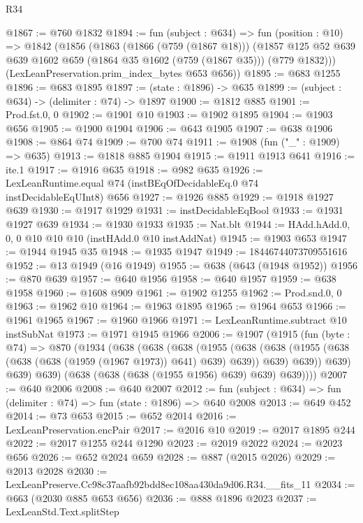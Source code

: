 \begin{lexlean}{R34}
\begin{coremodule}
@1867 := @760 @1832
@1894 := fun (subject : @634) =>
  fun (position : @10) =>
  @1842
    (@1856
      (@1863
        (@1866 (@759 (@1867 @18)))
        (@1857 @125 @52 @639 @639 @1602 @659 (@1864 @35 @1602 (@759 (@1867 @35))) (@779 @1832)))
      (LexLeanPreservation.prim_index_bytes @653 @656))
@1895 := @683 @1255
@1896 := @683 @1895
@1897 := (state : @1896) -> @635
@1899 := (subject : @634) -> (delimiter : @74) -> @1897
@1900 := @1812 @885
@1901 := Prod.fst.{0, 0}
@1902 := @1901 @10
@1903 := @1902 @1895
@1904 := @1903 @656
@1905 := @1900 @1904
@1906 := @643 @1905
@1907 := @638 @1906
@1908 := @864 @74
@1909 := @700 @74
@1911 := @1908 (fun ("_" : @1909) => @635)
@1913 := @1818 @885 @1904
@1915 := @1911 @1913 @641
@1916 := ite.{1}
@1917 := @1916 @635
@1918 := @982 @635
@1926 := LexLeanRuntime.equal @74 (instBEqOfDecidableEq.{0} @74 instDecidableEqUInt8) @656
@1927 := @1926 @885
@1929 := @1918 @1927 @639
@1930 := @1917 @1929
@1931 := instDecidableEqBool
@1933 := @1931 @1927 @639
@1934 := @1930 @1933
@1935 := Nat.blt
@1944 := HAdd.hAdd.{0, 0, 0} @10 @10 @10 (instHAdd.{0} @10 instAddNat)
@1945 := @1903 @653
@1947 := @1944 @1945 @35
@1948 := @1935 @1947
@1949 := 18446744073709551616
@1952 := @13 @1949 (@16 @1949)
@1955 := @638 (@643 (@1948 @1952))
@1956 := @870 @639
@1957 := @640 @1956
@1958 := @640 @1957
@1959 := @638 @1958
@1960 := @1608 @909
@1961 := @1902 @1255
@1962 := Prod.snd.{0, 0}
@1963 := @1962 @10
@1964 := @1963 @1895
@1965 := @1964 @653
@1966 := @1961 @1965
@1967 := @1960 @1966
@1971 := LexLeanRuntime.subtract @10 instSubNat
@1973 := @1971 @1945 @1966
@2006 := @1907
    (@1915
      (fun (byte : @74) =>
      @870
        (@1934
          (@638
            (@638
              (@638
                (@1955
                  (@638
                    (@638 (@1955 (@638 (@638 (@638 (@1959 (@1967 @1973)) @641) @639) @639)) @639)
                    @639))
                @639)
              @639)
            @639)
          (@638 (@638 (@638 (@1955 @1956) @639) @639) @639))))
@2007 := @640 @2006
@2008 := @640 @2007
@2012 := fun (subject : @634) => fun (delimiter : @74) => fun (state : @1896) => @640 @2008
@2013 := @649 @452
@2014 := @73 @653
@2015 := @652 @2014
@2016 := LexLeanPreservation.encPair
@2017 := @2016 @10
@2019 := @2017 @1895 @244
@2022 := @2017 @1255 @244 @1290
@2023 := @2019 @2022
@2024 := @2023 @656
@2026 := @652 @2024 @659
@2028 := @887 (@2015 @2026)
@2029 := @2013 @2028
@2030 := LexLeanPreserve.Cc98c37aafb92bdd8ec108aa430da9d06.R34.__fits_11
@2034 := @663 (@2030 @885 @653 @656)
@2036 := @888 @1896 @2023
@2037 := LexLeanStd.Text.splitStep

\end{coremodule}
\end{lexlean}
